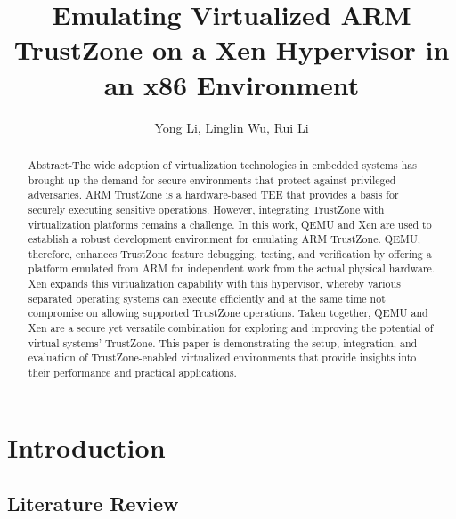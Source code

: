 \documentclass[acmtog]{acmart}
\begin{document}
\title{Emulating Virtualized ARM TrustZone on a Xen Hypervisor in an x86 Environment}


\author{Yong Li, Linglin Wu, Rui Li}

\renewcommand{\shortauthors}{Yong Li, Linglin Wu, Rui Li}


\begin{abstract} 
  Abstract-The wide adoption of virtualization technologies in embedded systems has brought up the demand for secure environments that protect against privileged adversaries. ARM TrustZone is a hardware-based TEE that provides a basis for securely executing sensitive operations. However, integrating TrustZone with virtualization platforms remains a challenge. In this work, QEMU and Xen are used to establish a robust development environment for emulating ARM TrustZone. QEMU, therefore, enhances TrustZone feature debugging, testing, and verification by offering a platform emulated from ARM for independent work from the actual physical hardware. Xen expands this virtualization capability with this hypervisor, whereby various separated operating systems can execute efficiently and at the same time not compromise on allowing supported TrustZone operations. Taken together, QEMU and Xen are a secure yet versatile combination for exploring and improving the potential of virtual systems' TrustZone. This paper is demonstrating the setup, integration, and evaluation of TrustZone-enabled virtualized environments that provide insights into their performance and practical applications. 
\end{abstract}


    
\maketitle

\section{Introduction}

\subsection{Literature Review}
\end{document}
